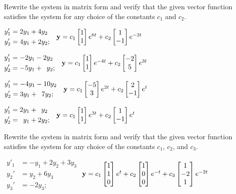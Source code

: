 \begin{exerciselist}

\item\label{exer:10.2.1}Rewrite the system in matrix form and
 verify that the given vector function satisfies the  system for
any choice of the constants $c_1$ and $c_2$.

\begin{alist}[itemsep=1ex]
\item %
 $\begin{aligned}y'_1&=2y_1 + 4y_2\\y_2'&=4y_1+2y_2;\end{aligned}  \quad
\mathbf{y}=c_1\begin{bmatrix}1\\1\end{bmatrix}e^{6t}+c_2\begin{bmatrix}1\\-1\end{bmatrix}e^{-2t}$

\item %
 $\begin{aligned}y'_1&=-2y_1 - 2y_2\\y_2'&=-5y_1 + \phantom{2}y_2;\end{aligned}
   \quad
\mathbf{y}=c_1\begin{bmatrix}1\\1\end{bmatrix}e^{-4t}+c_2\begin{bmatrix}-2\\5\end{bmatrix}e^{3t}$

\item %
 $\begin{aligned}y'_1&=-4y_1 -10y_2\\
y_2'&=3y_1 + \phantom{1}7y_2;\end{aligned}  \quad
\mathbf{y}=c_1\begin{bmatrix}-5\\3\end{bmatrix}e^{2t}+c_2\begin{bmatrix}2\\-1\end{bmatrix}e^t$

\item %
 $\begin{aligned}y'_1&=2y_1 +\phantom{2}y_2 \\
y_2'&=\phantom{2}y_1 + 2y_2;\end{aligned} \quad
 \mathbf{y}=c_1\begin{bmatrix}1\\1\end{bmatrix}e^{3t}+c_2\begin{bmatrix}1\\-1\end{bmatrix}e^t$
\end{alist}

\item\label{exer:10.2.2}Rewrite the system in matrix form and
 verify that the given vector function satisfies the  system for
any choice of the constants $c_1$, $c_2$, and $c_3$.


\begin{alist}[itemsep=1ex]
\item %
$\begin{aligned}
y'_1&=- y_1+2y_2 + 3y_3 \\
y_2'&=y_2 + 6y_3\\
y_3'&=- 2y_3;\end{aligned}$
\quad
$\mathbf{y}=c_1\begin{bmatrix}1\\1\\0\end{bmatrix}e^t+c_2\begin{bmatrix}1\\0\\0\end{bmatrix}e^{-t}+c_3\begin{bmatrix}1\\-2\\1\end{bmatrix}e^{-2t}$


\end{alist}
\end{exerciselist}

